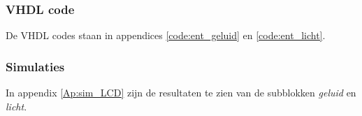 \subsubsection{VHDL code}
De VHDL codes staan in appendices \ref{code:ent_geluid} en \ref{code:ent_licht}.

\subsubsection{Simulaties}
In appendix \ref{Ap:sim_LCD} zijn de resultaten te zien van de subblokken \emph{geluid} en \emph{licht}.
